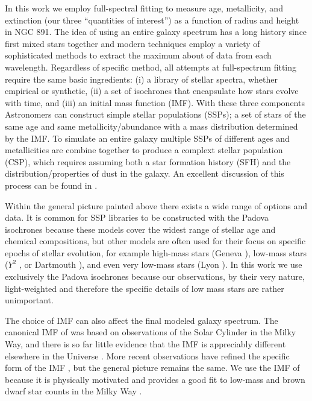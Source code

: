 In this work we employ full-spectral fitting to measure age,
metallicity, and extinction (our three ``quantities of interest'') as
a function of radius and height in NGC 891. The idea of using an
entire galaxy spectrum has a long history since \citet{Spinrad71}
first mixed stars together and modern techniques employ a variety of
sophisticated methods to extract the maximum about of data from each
wavelength. Regardless of specific method, all attempts at
full-spectrum fitting require the same basic ingredients: (i) a
library of stellar spectra, whether empirical or synthetic, (ii) a set
of isochrones that encapsulate how stars evolve with time, and (iii)
an initial mass function (IMF). With these three components
Astronomers can construct simple stellar populations (SSPs); a set of
stars of the same age and same metallicity/abundance with a mass
distribution determined by the IMF. To simulate an entire galaxy
multiple SSPs of different ages and metallicities are combine together
to produce a complext stellar population (CSP), which requires
assuming both a star formation history (SFH) and the
distribution/properties of dust in the galaxy. An excellent discussion
of this process can be found in \citet[with accompaning Figure
\ref{intro:fig:conroy}]{Conroy13}.

Within the general picture painted above there exists a wide range of
options and data. It is common for SSP libraries to be constructed
with the Padova isochrones \citep{Bertelli94, Girardi00, Marigo08}
because these models cover the widest range of stellar age and
chemical compositions, but other models are often used for their focus
on specific epochs of stellar evolution, for example high-mass stars
(Geneva \citep{Schaller92,Meynet00}), low-mass stars ($Y^2$
\citep{Yi01,Yi03}, or Dartmouth \citep{Dotter08}), and even very
low-mass stars (Lyon \citep{Chabrier97,Baraffe98}). In this work we
use exclusively the Padova isochrones because our observations, by
their very nature, light-weighted and therefore the specific details
of low mass stars are rather unimportant.

The choice of IMF can also affect the final modeled galaxy
spectrum. The canonical IMF of \citet{Salpeter55} was based on
observations of the Solar Cylinder in the Milky Way, and there is so
far little evidence that the IMF is appreciably different elsewhere in
the Universe \citep{Bastian10}. More recent observations have refined
the specific form of the IMF \citep{Kroupa01, Chabrier03}, but the
general picture remains the same. We use the IMF of \citet{Chabrier03}
because it is physically motivated and provides a good fit to low-mass
and brown dwarf star counts in the Milky Way
\citep{Bruzual03,Chabrier01,Chabrier03}.

